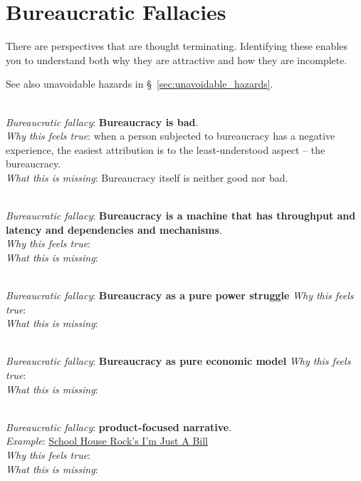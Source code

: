 \section{Bureaucratic Fallacies\label{sec:fallacies}}

There are perspectives that are \gls{thought terminating}. Identifying these enables you to understand both why they are attractive and how they are incomplete.

See also unavoidable hazards in \S~\ref{sec:unavoidable_hazards}.

\ \\

\textit{Bureaucratic fallacy}: \textbf{Bureaucracy is bad}. \\
\textit{Why this feels true}: when a person subjected to bureaucracy has a negative experience, the easiest attribution is to the least-understood aspect -- the bureaucracy.\\
\textit{What this is missing}: Bureaucracy itself is neither good nor bad. 

\ \\

\textit{Bureaucratic fallacy}: \textbf{Bureaucracy is a machine that has throughput and latency and dependencies and mechanisms}.\\
\textit{Why this feels true}: \\
\textit{What this is missing}: 

\ \\

\textit{Bureaucratic fallacy}: \textbf{Bureaucracy as a pure power struggle}
\textit{Why this feels true}: \\
\textit{What this is missing}: 

\ \\

\textit{Bureaucratic fallacy}: \textbf{Bureaucracy as pure economic model}
\textit{Why this feels true}: \\
\textit{What this is missing}: 

\ \\ 

\textit{Bureaucratic fallacy}: \textbf{product-focused narrative}. \\
\textit{Example}: \href{https://www.youtube.com/watch?v=OgVKvqTItto}{School House Rock's I'm Just A Bill}\\
\textit{Why this feels true}: \\
\textit{What this is missing}: 

\ \\


